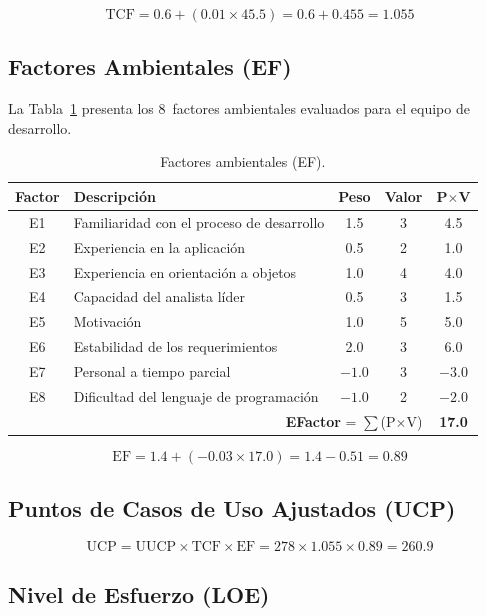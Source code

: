 \[
\text{TCF} = 0.6 + (0.01 \times 45.5) = 0.6 + 0.455 = \mathbf{1.055}
\]

\subsection{Factores Ambientales (EF)}

La Tabla~\ref{tab:ef} presenta los 8~factores ambientales evaluados para el equipo de desarrollo.

\begin{table}[H]
\centering
\begin{tabular}{|c|p{}|c|c|c|}
\hline
\textbf{Factor} & \textbf{Descripción} & \textbf{Peso} & \textbf{Valor} & \textbf{P$\times$V} \\
\hline
E1 & Familiaridad con el proceso de desarrollo & 1.5 & 3 & 4.5 \\
\hline
E2 & Experiencia en la aplicación & 0.5 & 2 & 1.0 \\
\hline
E3 & Experiencia en orientación a objetos & 1.0 & 4 & 4.0 \\
\hline
E4 & Capacidad del analista líder & 0.5 & 3 & 1.5 \\
\hline
E5 & Motivación & 1.0 & 5 & 5.0 \\
\hline
E6 & Estabilidad de los requerimientos & 2.0 & 3 & 6.0 \\
\hline
E7 & Personal a tiempo parcial & $-1.0$ & 3 & $-3.0$ \\
\hline
E8 & Dificultad del lenguaje de programación & $-1.0$ & 2 & $-2.0$ \\
\hline
\multicolumn{4}{|r|}{\textbf{EFactor} = $\sum$(P$\times$V)} & \textbf{17.0} \\
\hline
\end{tabular}
\caption{Factores ambientales (EF).}
\label{tab:ef}
\end{table}

\[
\text{EF} = 1.4 + (-0.03 \times 17.0) = 1.4 - 0.51 = \mathbf{0.89}
\]

\subsection{Puntos de Casos de Uso Ajustados (UCP)}

\[
\text{UCP} = \text{UUCP} \times \text{TCF} \times \text{EF} = 278 \times 1.055 \times 0.89 = \mathbf{260.9}
\]

\subsection{Nivel de Esfuerzo (LOE)}

